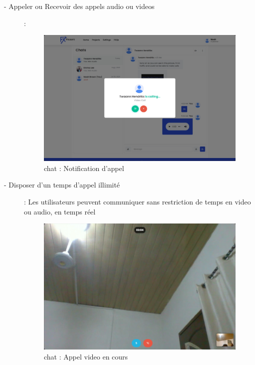 {\begin{description}
    \item[- Appeler ou Recevoir des appels audio ou videos] :

\vspace{0.35cm}
\begin{figure}[H]
\begin{center}
\includegraphics[width=12cm]{assets/demo/chat-3.png}
\end{center}
\caption{chat : Notification d'appel}
\end{figure}

    \item[- Disposer d'un temps d'appel illimité] : Les utilisateurs peuvent communiquer sans restriction de temps en video ou audio, en temps réel

\vspace{0.35cm}
\begin{figure}[H]
\begin{center}
\includegraphics[width=12cm]{assets/demo/chat-4.png}
\end{center}
\caption{chat : Appel video en cours}
\end{figure}
\end{description}


}
